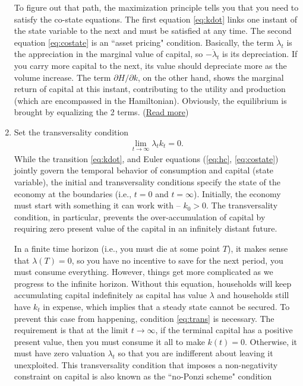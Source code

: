\documentclass[11pt,a4paper]{book}
\theoremstyle{definition}\newtheorem{definition}{Definition}
\theoremstyle{definition}\newtheorem{fact}{Fact}
\theoremstyle{definition}\newtheorem{remark}{Remark}
\theoremstyle{definition}\newtheorem{ex}{Ex.}
\theoremstyle{definition}\newtheorem{project}{Project}
\theoremstyle{definition}\newtheorem{problem}{Problem}
\theoremstyle{definition}\newtheorem{example}{Example}
\numberwithin{theorem}{section}
\numberwithin{corollary}{chapter}
\numberwithin{assumption}{chapter}
\numberwithin{definition}{chapter}
\numberwithin{prop}{chapter}
\numberwithin{notation}{chapter}
\numberwithin{problem}{chapter}
\numberwithin{example}{chapter}
\numberwithin{fact}{chapter}
\numberwithin{ex}{chapter}
\begin{document}
\begin{enumerate}
		To figure out that path, the maximization principle tells you that you need to satisfy the co-state equations. The first equation \eqref{eq:kdot} links one instant of the state variable to the next and must be satisfied at any time. The second equation \eqref{eq:costate} is an ``asset pricing" condition. Basically, the term $\dot{\lambda}_t$ is the appreciation in the marginal value of capital, so $-\dot{\lambda}_t$ is its depreciation. If you carry more capital to the next, its value should depreciate more as the volume increase. The term $\partial H/\partial k$, on the other hand, shows the marginal return of capital at this instant, contributing to the utility and production (which are encompassed in the Hamiltonian). Obviously, the equilibrium is brought by equalizing the 2 terms. (\href{https://www3.nd.edu/~nmark/Climate/CurrentValueHamiltonian.pdf}{Read more})
		
		\item Set the transversality condition
		\begin{align}
			\lim_{t\to\infty} \lambda_t k_t = 0. \label{eq:trans}
		\end{align}
		While the transition \eqref{eq:kdot}, and Euler equations (\eqref{eq:hc}, \eqref{eq:costate}) jointly govern the temporal behavior of consumption and capital (state variable), the initial and transversality conditions specify the state of the economy at the boundaries (i.e., $t = 0$ and $t = \infty$). Initially, the economy must start with something it can work with -- $k_0 > 0$. The transversality condition, in particular, prevents the over-accumulation of capital by requiring zero present value of the capital in an infinitely distant future. 
		
		In a finite time horizon (i.e., you must die at some point $T$), it makes sense that $\lambda(T) = 0$, so you have no incentive to save for the next period, you must consume everything. However, things get more complicated as we progress to the infinite horizon. Without this equation, households will keep accumulating capital indefinitely as capital has value $\lambda$ and households still have $k_t$ in expense, which implies that a steady state cannot be secured. To prevent this case from happening, condition \eqref{eq:trans} is necessary. The requirement is that at the limit $t\to\infty$, if the terminal capital has a positive present value, then you must consume it all to make $k(t) = 0$. Otherwise, it must have zero valuation $\lambda_t$ so that you are indifferent about leaving it unexploited. This transversality condition that imposes a non-negativity constraint on capital is also known as the ``no-Ponzi scheme" condition
		

\end{enumerate}
\end{document}
